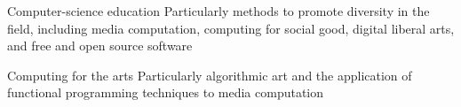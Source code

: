 
\begin{cventries}

  \cventryB
    {Computer-science education}{}{}
  \cventryNote
    {Particularly methods to promote diversity in the field, including
     media computation, computing for social good, digital liberal
     arts, and free and open source software}
    
  \cventryB
    {Computing for the arts}{}{}
  \cventryNote
    {Particularly algorithmic art and the application of functional 
     programming techniques to media computation}

\end{cventries}

